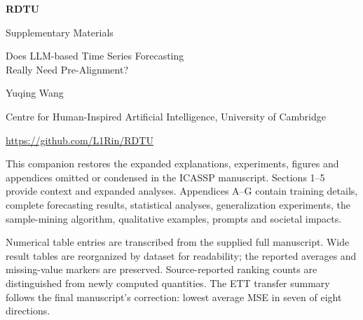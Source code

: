 \documentclass[10pt,a4paper]{article}
\begin{document}
\begin{center}
{\Huge\sffamily\bfseries\color{ink} RDTU}\par\vspace{8pt}
{\LARGE\sffamily Supplementary Materials}\par\vspace{12pt}
{\Large Does LLM-based Time Series Forecasting\\ Really Need Pre-Alignment?}\par\vspace{10pt}
{\large Yuqing Wang}\par
Centre for Human-Inspired Artificial Intelligence, University of Cambridge\par\vspace{8pt}
\url{https://github.com/L1Rin/RDTU}
\end{center}
\vspace{10pt}
\begin{tcolorbox}[colback=blue!3,colframe=accent,boxrule=.5pt,arc=1mm]
This companion restores the expanded explanations, experiments, figures and appendices omitted or condensed in the ICASSP manuscript. Sections 1--5 provide context and expanded analyses. Appendices A--G contain training details, complete forecasting results, statistical analyses, generalization experiments, the sample-mining algorithm, qualitative examples, prompts and societal impacts.
\end{tcolorbox}
Numerical table entries are transcribed from the supplied full manuscript. Wide result tables are reorganized by dataset for readability; the reported averages and missing-value markers are preserved. Source-reported ranking counts are distinguished from newly computed quantities. The ETT transfer summary follows the final manuscript's correction: lowest average MSE in seven of eight directions.
\begingroup\small\tableofcontents\endgroup
\clearpage
\FloatBarrier{}
\FloatBarrier{}
\FloatBarrier{}
\FloatBarrier{}
\FloatBarrier{}
\appendix
\FloatBarrier{}
\FloatBarrier{}
\FloatBarrier{}
\FloatBarrier{}
\FloatBarrier{}
\FloatBarrier{}
\FloatBarrier{}
\end{document}
